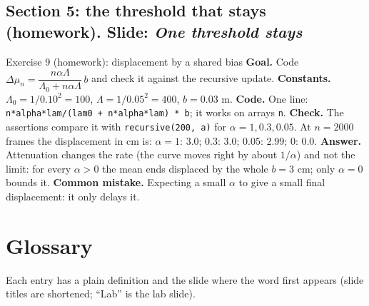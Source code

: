\documentclass[11pt]{article}
\begin{document}
\subsection*{Section 5: the threshold that stays (homework). Slide: \emph{One threshold stays}}

\begin{labhelp}{Exercise 9 (homework): displacement by a shared bias}
\textbf{Goal.} Code $\Delta\mu_n=\dfrac{n\alpha\Lambda}{\Lambda_0+n\alpha\Lambda}\,b$ and check it against the recursive update. \textbf{Constants.} $\Lambda_0=1/0.10^2=100$, $\Lambda=1/0.05^2=400$, $b=0.03$ m. \textbf{Code.} One line: \texttt{n*alpha*lam/(lam0 + n*alpha*lam) * b}; it works on arrays \texttt{n}. \textbf{Check.} The assertions compare it with \texttt{recursive(200, a)} for $\alpha=1,0.3,0.05$. At $n=2000$ frames the displacement in cm is: $\alpha=1$: 3.0; $0.3$: 3.0; $0.05$: 2.99; $0$: 0.0. \textbf{Answer.} Attenuation changes the rate (the curve moves right by about $1/\alpha$) and not the limit: for every $\alpha>0$ the mean ends displaced by the whole $b=3$ cm; only $\alpha=0$ bounds it. \textbf{Common mistake.} Expecting a small $\alpha$ to give a small final displacement: it only delays it.
\end{labhelp}

\section{Glossary}

Each entry has a plain definition and the slide where the word first appears (slide titles are shortened; ``Lab'' is the lab slide).
\end{document}
